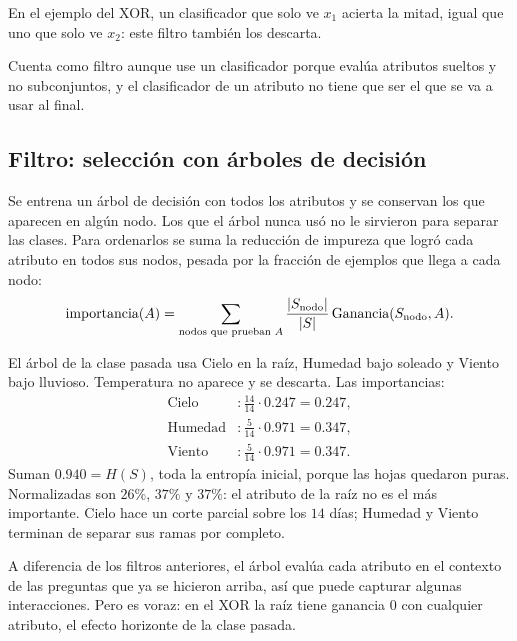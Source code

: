 \documentclass[11pt,letterpaper]{article}
\begin{document}
En el ejemplo del XOR, un clasificador que solo ve $x_1$ acierta la
mitad, igual que uno que solo ve $x_2$: este filtro también los
descarta.

Cuenta como filtro aunque use un clasificador porque evalúa atributos
sueltos y no subconjuntos, y el clasificador de un atributo no tiene
que ser el que se va a usar al final.


\subsection*{Filtro: selección con árboles de decisión}

Se entrena un árbol de decisión con todos los atributos y se conservan
los que aparecen en algún nodo. Los que el árbol nunca usó no le
sirvieron para separar las clases. Para ordenarlos se suma la
reducción de impureza que logró cada atributo en todos sus nodos,
pesada por la fracción de ejemplos que llega a cada nodo:
\[
    \text{importancia}(A) = \sum_{\text{nodos que prueban } A}
        \frac{\left\lvert S_{\text{nodo}} \right\rvert}{\left\lvert S \right\rvert}\,
        \text{Ganancia}(S_{\text{nodo}}, A) .
\]

\begin{ejemplo}
    El árbol de la clase pasada usa Cielo en la raíz, Humedad bajo
    soleado y Viento bajo lluvioso. Temperatura no aparece y se
    descarta. Las importancias:
    \begin{align*}
        \text{Cielo}   &: \tfrac{14}{14} \cdot 0.247 = 0.247 , \\
        \text{Humedad} &: \tfrac{5}{14} \cdot 0.971 = 0.347 , \\
        \text{Viento}  &: \tfrac{5}{14} \cdot 0.971 = 0.347 .
    \end{align*}
    Suman $0.940 = H(S)$, toda la entropía inicial, porque las hojas
    quedaron puras. Normalizadas son $26\%$, $37\%$ y $37\%$: el
    atributo de la raíz no es el más importante. Cielo hace un corte
    parcial sobre los $14$ días; Humedad y Viento terminan de separar
    sus ramas por completo.
\end{ejemplo}

A diferencia de los filtros anteriores, el árbol evalúa cada atributo
en el contexto de las preguntas que ya se hicieron arriba, así que
puede capturar algunas interacciones. Pero es voraz: en el XOR la raíz
tiene ganancia $0$ con cualquier atributo, el efecto horizonte de la
clase pasada.
\end{document}

